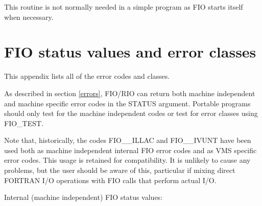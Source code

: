 \begin{small}
{{{         \sstitem
         This routine is not normally needed in a simple program as FIO
            starts itself when necessary.
      }
   }
}

\end{small}
\newpage
\section{FIO status values and error classes}
\label{status-values}

This appendix lists all of the error codes and classes.

As described in section \ref{errors}, FIO/RIO can return both machine
independent and machine specific error codes in the STATUS argument. Portable
programs should only test for the machine independent codes or test for error
classes using FIO\_TEST.

Note that, historically, the codes FIO\_\_ILLAC and FIO\_\_IVUNT have been used
both as machine independent internal FIO error codes and as VMS specific error
codes. This usage is retained for compatibility. It is unlikely to cause any
problems, but the user should be aware of this, particular if mixing direct
FORTRAN I/O operations with FIO calls that perform actual I/O.

Internal (machine independent) FIO status values:

